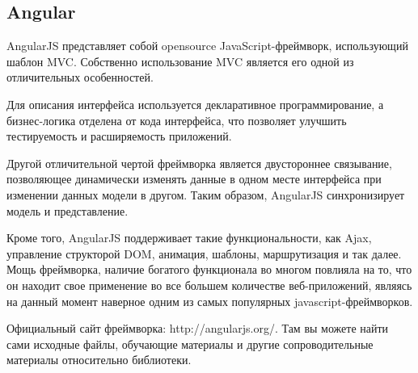 \subsection{Angular}

AngularJS представляет собой opensource JavaScript-фреймворк, использующий шаблон MVC. Собственно использование MVC является его одной из отличительных особенностей.

Для описания интерфейса используется декларативное программирование, а бизнес-логика отделена от кода интерфейса, что позволяет улучшить тестируемость и расширяемость приложений.

Другой отличительной чертой фреймворка является двустороннее связывание, позволяющее динамически изменять данные в одном месте интерфейса при изменении данных модели в другом. Таким образом, AngularJS синхронизирует модель и представление.

Кроме того, AngularJS поддерживает такие функциональности, как Ajax, управление структорой DOM, анимация, шаблоны, маршрутизация и так далее. Мощь фреймворка, наличие богатого функционала во многом повлияла на то, что он находит свое применение во все большем количестве веб-приложений, являясь на данный момент наверное одним из самых популярных javascript-фреймворков.

Официальный сайт фреймворка: http://angularjs.org/. Там вы можете найти сами исходные файлы, обучающие материалы и другие сопроводительные материалы относительно библиотеки.